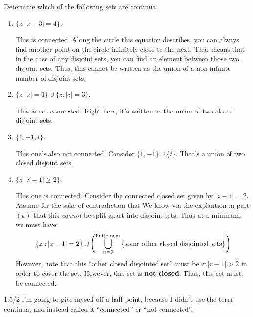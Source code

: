 \begin{enumerate}
	Determine which of the following sets are continua.
	\begin{enumerate}
		\item $\{z : |z-3| = 4\}$.
		\begin{problem}
			This is connected. Along the circle this equation describes, you can always find another point on the circle infinitely close to the next. That means that in the case of any disjoint sets, you can find an element between those two disjoint sets. Thus, this cannot be written as the union of a non-infinite number of disjoint sets. 
		\end{problem}
		\item $\{z : |z| = 1\} \cup \{z : |z|=3\}$.
		\begin{problem}
			This is not connected. Right here, it's written as the union of two closed disjoint sets. 
		\end{problem}
		\item $\{1, -1, i\}$.
		\begin{problem}
			This one's also not connected. Consider $\{1, -1\}\cup\{i\}$. That's a union of two closed disjoint sets. 
		\end{problem}
		\item $\{z : |z-1| \geq 2\}$.
		\begin{problem}
			This one is connected. Consider the connected closed set given by $|z-1|=2$. Assume for the sake of contradiction that  We know via the explantion in part $(a)$ that this \textit{cannot} be split apart into disjoint sets. Thus at a minimum, we must have:
			\begin{align*}
				\{z:|z-1|=2\}\cup \left(\bigcup_{n=0}^\text{finite num}\text{\{some other closed disjointed sets\}} \right)
			\end{align*}
			However, note that this ``other closed disjointed set'' must be ${z:|z-1|>2}$ in order to cover the set. However, this set is \textbf{not closed}. Thus, this set must be connected. 
		\end{problem}
		
	\end{enumerate}
	\begin{grade}
		1.5/2\gline{}
		I'm going to give myself off a half point, because I didn't use the term continua, and instead called it ``connected'' or ``not connected''.
	\end{grade}
\end{enumerate}



